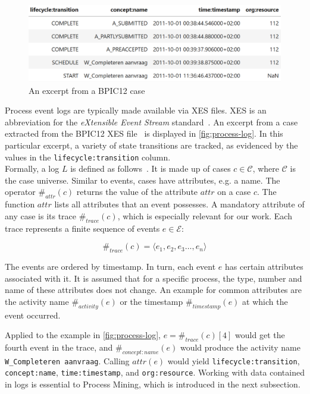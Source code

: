 \begin{figure}
    \centering
    \begin{adjustbox}{center}
    \includegraphics[width=1\textwidth]{gfx/process-log.png}
    \end{adjustbox}
    \caption{An excerpt from a BPIC12 case}
    \label{fig:process-log}
\end{figure}

Process event logs are typically made available via XES files. XES is an abbreviation for the \textit{eXtensible Event Stream} standard~\cite{gunther2013xes}. An excerpt from a case extracted from the BPIC12 XES file~\cite{BPIC2012} is displayed in \autoref{fig:process-log}. In this particular excerpt, a variety of state transitions are tracked, as evidenced by the values in the \verb=lifecycle:transition= column.\\

Formally, a log $L$ is defined as follows~\cite{Aalst2016}. It is made up of cases $c \in \mathscr{C}$, where $\mathscr{C}$ is the case universe. Similar to events, cases have attributes, e.g. a name. The operator $\#_{attr}(c)$ returns the value of the attribute $attr$ on a case $c$. The function $attr$ lists all attributes that an event possesses. A mandatory attribute of any case is its trace $\#_{trace}(c)$, which is especially relevant for our work.
Each trace represents a finite sequence of events $e \in \mathscr{E}$:

$$ \#_{trace}(c) = \langle e_1, e_2, e_3 \dots, e_n \rangle $$

The events are ordered by timestamp. In turn, each event $e$ has certain attributes associated with it. It is assumed that for a specific process, the type, number and name of these attributes does not change. An example for common attributes are the activity name $\#_{activity}(e)$ or the timestamp $\#_{timestamp}(e)$ at which the event occurred.

Applied to the example in \autoref{fig:process-log}, $e = \#_{trace}(c)[4]$ would get the fourth event in the trace, and $\#_{concept:name}(e)$ would produce the activity name \verb=W_Completeren aanvraag=. Calling $attr(e)$ would yield \verb=lifecycle:transition=, \verb=concept:name=, \verb=time:timestamp=, and \verb=org:resource=. Working with data contained in logs is essential to Process Mining, which is introduced in the next subsection.

